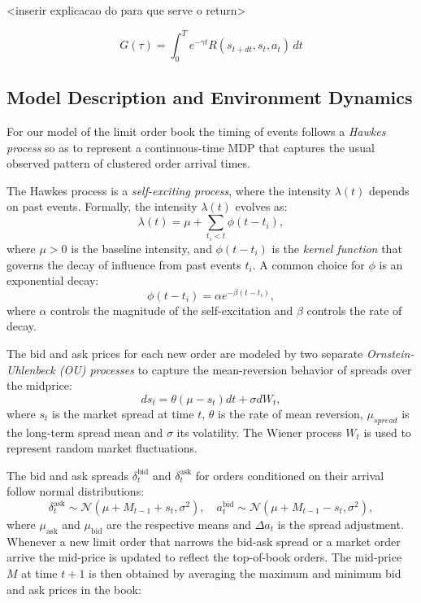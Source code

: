 <inserir explicacao do para que serve o return>

\begin{equation}
G(\tau) = \int_0^T e^{-\gamma t} R(s_{t+dt}, s_t, a_t) \, dt
\end{equation}

\subsection{Model Description and Environment Dynamics}

For our model of the limit order book the timing of events follows a \textit{Hawkes process} so as to represent a continuous-time MDP that captures the usual observed pattern of clustered order arrival times.

The Hawkes process is a \textit{self-exciting process}, where the intensity \( \lambda(t) \) depends on past events. Formally, the intensity \( \lambda(t) \) evolves as:
$$
\lambda(t) = \mu + \sum_{t_i < t} \phi(t - t_i),
$$
where \( \mu > 0 \) is the baseline intensity, and \( \phi(t - t_i) \) is the \textit{kernel function} that governs the decay of influence from past events \( t_i \). A common choice for \( \phi \) is an exponential decay:
$$
\phi(t - t_i) = \alpha e^{-\beta (t - t_i)},
$$
where \( \alpha \) controls the magnitude of the self-excitation and \( \beta \) controls the rate of decay.

The bid and ask prices for each new order are modeled by two separate \textit{Ornstein-Uhlenbeck (OU) processes} to capture the mean-reversion behavior of spreads over the midprice:
$$
ds_t = \theta(\mu - s_t) dt + \sigma dW_t,
$$
where \( s_t \) is the market spread at time \( t \), \( \theta \) is the rate of mean reversion, \( \mu_{spread} \) is the long-term spread mean and \( \sigma \) its volatility. The Wiener process \( W_t \) is used to represent random market fluctuations.

The bid and ask spreads \( \delta_t^{\text{bid}} \) and \( \delta_t^{\text{ask}} \) for orders conditioned on their arrival follow normal distributions:
$$
\delta_t^{\text{ask}} \sim \mathcal{N}(\mu + M_{t-1} + s_t, \sigma^2), \quad a_t^{\text{bid}} \sim \mathcal{N}(\mu + M_{t-1} - s_t, \sigma^2),
$$
where \( \mu_{\text{ask}} \) and \( \mu_{\text{bid}} \) are the respective means and \( \Delta a_t \) is the spread adjustment. Whenever a new limit order that narrows the bid-ask spread or a market order arrive the mid-price is updated to reflect the top-of-book orders. The mid-price \( M \) at time $t+1$ is then obtained by averaging the maximum and minimum bid and ask prices in the book:

